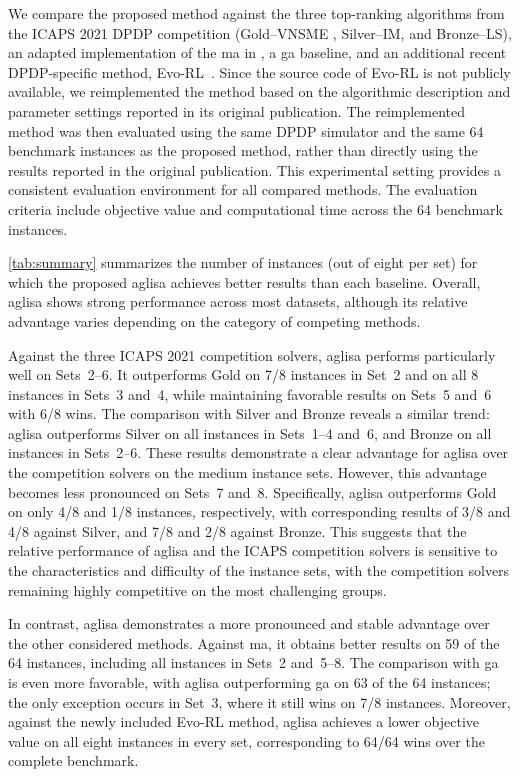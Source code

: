 \documentclass[pdflatex]{sn-jnl}
\begin{document}
We compare the proposed method against the three top-ranking algorithms from the ICAPS 2021 DPDP competition (Gold--VNSME \cite{cai2022variable}, Silver--IM, and Bronze--LS), an adapted implementation of the \gls{ma} in \cite{zhou2024memetic}, a \gls{ga} baseline, and an additional recent DPDP-specific method, Evo-RL~\cite{yang2026collaborative}. Since the source code of Evo-RL is not publicly available, we reimplemented the method based on the algorithmic description and parameter settings reported in its original publication. The reimplemented method was then evaluated using the same DPDP simulator and the same 64 benchmark instances as the proposed method, rather than directly using the results reported in the original publication. This experimental setting provides a consistent evaluation environment for all compared methods. The evaluation criteria include objective value and computational time across the 64 benchmark instances.


\autoref{tab:summary} summarizes the number of instances (out of eight per set) for which the proposed \gls{aglisa} achieves better results than each baseline. Overall, \gls{aglisa} shows strong performance across most datasets, although its relative advantage varies depending on the category of competing methods.

Against the three ICAPS 2021 competition solvers, \gls{aglisa} performs particularly well on Sets~2--6. It outperforms Gold on 7/8 instances in Set~2 and on all 8 instances in Sets~3 and~4, while maintaining favorable results on Sets~5 and~6 with 6/8 wins. The comparison with Silver and Bronze reveals a similar trend: \gls{aglisa} outperforms Silver on all instances in Sets~1--4 and~6, and Bronze on all instances in Sets~2--6. These results demonstrate a clear advantage for \gls{aglisa} over the competition solvers on the medium instance sets. However, this advantage becomes less pronounced on Sets~7 and~8. Specifically, \gls{aglisa} outperforms Gold on only 4/8 and 1/8 instances, respectively, with corresponding results of 3/8 and 4/8 against Silver, and 7/8 and 2/8 against Bronze. This suggests that the relative performance of \gls{aglisa} and the ICAPS competition solvers is sensitive to the characteristics and difficulty of the instance sets, with the competition solvers remaining highly competitive on the most challenging groups.

In contrast, \gls{aglisa} demonstrates a more pronounced and stable advantage over the other considered methods. Against \gls{ma}, it obtains better results on 59 of the 64 instances, including all instances in Sets~2 and~5--8. The comparison with \gls{ga} is even more favorable, with \gls{aglisa} outperforming \gls{ga} on 63 of the 64 instances; the only exception occurs in Set~3, where it still wins on 7/8 instances. Moreover, against the newly included Evo-RL method, \gls{aglisa} achieves a lower objective value on all eight instances in every set, corresponding to 64/64 wins over the complete benchmark.
\end{document}
